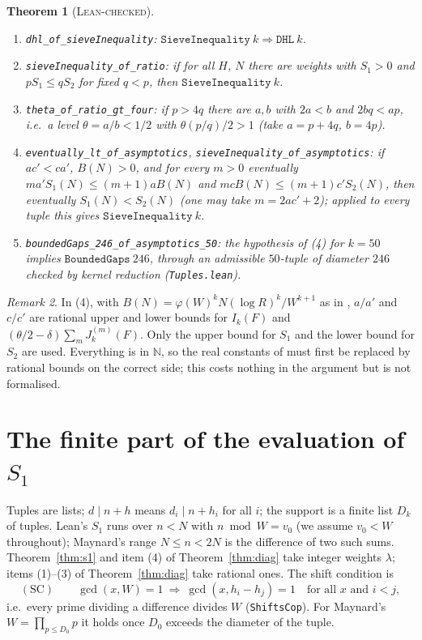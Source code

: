 \documentclass[11pt]{amsart}
\newtheorem{theorem}{Theorem}
\theoremstyle{definition}
\theoremstyle{remark}
\newtheorem{remark}[theorem]{Remark}
\newcommand{\lbl}[1]{\textup{\textsc{#1}}}
\newcommand{\tl}[1]{\texttt{#1}}
\begin{document}
\begin{theorem}[\lbl{Lean-checked}]\label{thm:skeleton}
\begin{enumerate}
\item \tl{dhl\_of\_sieveInequality}: $\tl{SieveInequality}\ k\Rightarrow\tl{DHL}\ k$.
\item \tl{sieveInequality\_of\_ratio}: if for all $H$, $N$ there are weights with
$S_1>0$ and $pS_1\le qS_2$ for fixed $q<p$, then $\tl{SieveInequality}\ k$.
\item \tl{theta\_of\_ratio\_gt\_four}: if $p>4q$ there are $a,b$ with
$2a<b$ and $2bq<ap$, i.e.\ a level $\theta=a/b<1/2$ with $\theta(p/q)/2>1$
(take $a=p+4q$, $b=4p$).
\item \tl{eventually\_lt\_of\_asymptotics}, \tl{sieveInequality\_of\_asymptotics}:
if $a c'<c a'$, $B(N)>0$, and for every $m>0$ eventually
$m a' S_1(N)\le(m+1)aB(N)$ and $m cB(N)\le(m+1)c'S_2(N)$, then eventually
$S_1(N)<S_2(N)$ (one may take $m=2ac'+2$); applied to every tuple this gives
$\tl{SieveInequality}\ k$.
\item \tl{boundedGaps\_246\_of\_asymptotics\_50}: the hypothesis of (4) for
$k=50$ implies $\tl{BoundedGaps}\ 246$, through an admissible $50$-tuple of
diameter $246$ checked by kernel reduction (\tl{Tuples.lean}).
\end{enumerate}
\end{theorem}

\begin{remark}
In (4), with $B(N)=\varphi(W)^kN(\log R)^k/W^{k+1}$ as in \cite[Prop.~4.1]{May15},
$a/a'$ and $c/c'$ are rational upper and lower bounds for $I_k(F)$ and
$(\theta/2-\delta)\sum_mJ^{(m)}_k(F)$. Only the upper bound for $S_1$
and the lower bound for $S_2$ are used. Everything is in $\mathbb N$, so the
real constants of \cite{May15} must first be replaced by rational bounds on
the correct side; this costs nothing in the argument but is not formalised.
\end{remark}

\section{The finite part of the evaluation of \texorpdfstring{$S_1$}{S1}}\label{sec:s1}

Tuples are lists; $d\mid n+h$ means $d_i\mid n+h_i$ for all $i$; the support is a
finite list $D_k$ of tuples. Lean's $S_1$ runs over $n<N$ with $n\bmod W=v_0$
(we assume $v_0<W$ throughout); Maynard's range $N\le n<2N$ is the difference of
two such sums. Theorem~\ref{thm:s1} and item (4) of Theorem~\ref{thm:diag} take
integer weights $\lambda$; items (1)--(3) of Theorem~\ref{thm:diag} take rational ones.
The shift condition is
\[
(\mathrm{SC})\qquad \gcd(x,W)=1\ \Rightarrow\ \gcd(x,h_i-h_j)=1\quad\text{for all }x\text{ and }i<j,
\]
i.e.\ every prime dividing a difference divides $W$ (\tl{ShiftsCop}). For
Maynard's $W=\prod_{p\le D_0}p$ it holds once $D_0$ exceeds the diameter of the
tuple.
\end{document}
